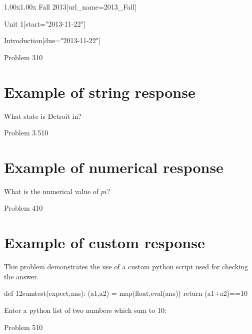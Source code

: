 \documentclass[12pt]{article}
\begin{document}
\begin{edXcourse}{1.00x}{1.00x Fall 2013}[url_name=2013_Fall]
\begin{edXchapter}{Unit 1}[start="2013-11-22"]
\begin{edXsection}{Introduction}[due="2013-11-22"]
\begin{edXproblem}{Problem 3}{10}

\section{Example of string response}  

What state is Detroit in?


\end{edXproblem}


\begin{edXproblem}{Problem 3.5}{10}

\section{Example of numerical response}  

What is the numerical value of $pi$?


\end{edXproblem}


\begin{edXproblem}{Problem 4}{10}

\section{Example of custom response}  

This problem demonstrates the use of a custom python script used for
checking the answer.

\begin{edXscript}
def 12sumtest(expect,ans):
    (a1,a2) = map(float,eval(ans))
    return (a1+a2)==10
\end{edXscript}

Enter a python list of two numbers which sum to 10:


\end{edXproblem}


\begin{edXproblem}{Problem 5}{10}


\end{edXproblem}
\end{edXsection}
\end{edXchapter}
\end{edXcourse}
\end{document}
